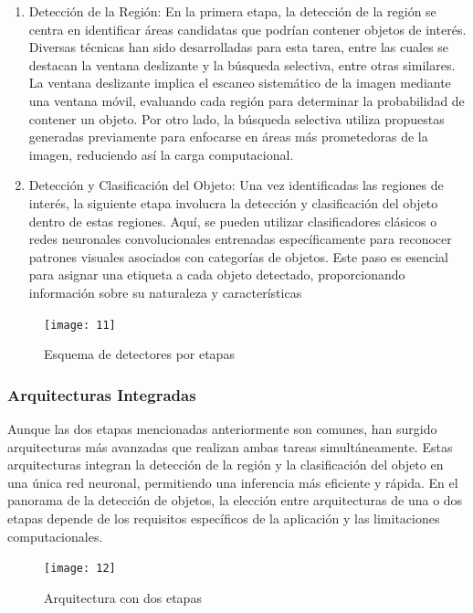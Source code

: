 	\begin{enumerate}
		\item Detección de la Región:
En la primera etapa, la detección de la región se centra en identificar áreas candidatas que podrían contener objetos de interés. Diversas técnicas han sido desarrolladas para esta tarea, entre las cuales se destacan la ventana deslizante y la búsqueda selectiva, entre otras similares. La ventana deslizante implica el escaneo sistemático de la imagen mediante una ventana móvil, evaluando cada región para determinar la probabilidad de contener un objeto. Por otro lado, la búsqueda selectiva utiliza propuestas generadas previamente para enfocarse en áreas más prometedoras de la imagen, reduciendo así la carga computacional.

	\item Detección y Clasificación del Objeto:
Una vez identificadas las regiones de interés, la siguiente etapa involucra la detección y clasificación del objeto dentro de estas regiones. Aquí, se pueden utilizar clasificadores clásicos o redes neuronales convolucionales entrenadas específicamente para reconocer patrones visuales asociados con categorías de objetos. Este paso es esencial para asignar una etiqueta a cada objeto detectado, proporcionando información sobre su naturaleza y características
	
	\end{enumerate}	

	\begin{figure}[ht]
	    \centering
		\texttt{[image: 11]}
		\caption{Esquema de detectores por etapas}
	\end{figure}
	
	\subsubsection{Arquitecturas Integradas}
	Aunque las dos etapas mencionadas anteriormente son comunes, han surgido arquitecturas más avanzadas que realizan ambas tareas simultáneamente. Estas arquitecturas integran la detección de la región y la clasificación del objeto en una única red neuronal, permitiendo una inferencia más eficiente y rápida.
En el panorama de la detección de objetos, la elección entre arquitecturas de una o dos etapas depende de los requisitos específicos de la aplicación y las limitaciones computacionales.

	\begin{figure}[ht]
	    \centering
		\texttt{[image: 12]}
		\caption{Arquitectura con dos etapas}
	\end{figure}
	
